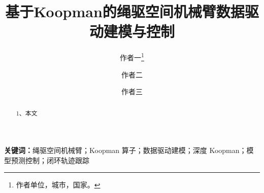 \documentclass[12pt,a4paper]{ctexart}
\theoremstyle{plain}
\theoremstyle{definition}
\theoremstyle{remark}
\begin{document}
\title{基于Koopman的绳驱空间机械臂数据驱动建模与控制}
\author{作者一\thanks{作者单位，城市，国家。} \and 作者二 \and 作者三}

\maketitle

\begin{abstract}


1、本文




\end{abstract}

\noindent\textbf{关键词：}绳驱空间机械臂；Koopman 算子；数据驱动建模；深度 Koopman；模型预测控制；闭环轨迹跟踪













% 
\end{document}
